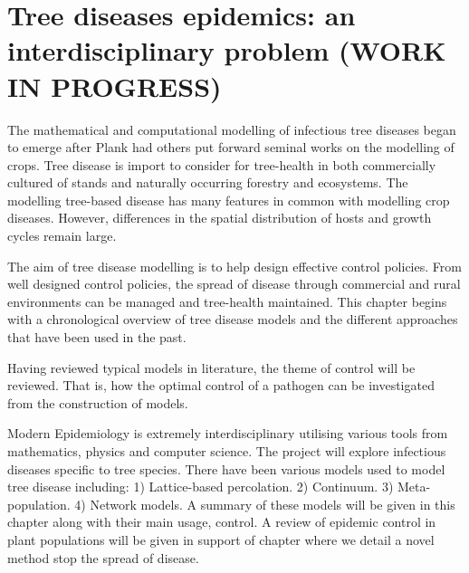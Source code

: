 

\chapter{Tree diseases epidemics: an interdisciplinary problem (WORK IN PROGRESS)}
\label{chapter2:litreview} 

The mathematical and computational modelling of infectious tree diseases began to emerge after Plank had others put forward seminal works on the modelling of crops. Tree disease is import to consider for tree-health in both commercially cultured of stands and naturally occurring forestry and ecosystems. The modelling tree-based disease has many features in common with modelling crop diseases. However, differences in the spatial distribution of hosts and growth cycles remain large.

The aim of tree disease modelling is to help design effective control policies. From well designed control policies, the spread of disease through commercial and rural environments can be managed and tree-health maintained. This chapter begins with a chronological overview of tree disease models and the different approaches that have been used in the past.

Having reviewed typical models in literature, the theme of control will be reviewed. That is, how the optimal control of a pathogen can be investigated from the construction of models.

Modern Epidemiology is extremely interdisciplinary utilising various tools from mathematics, physics and computer science. The project will explore infectious diseases specific to tree species. There have been various models used to model tree disease including: 1) Lattice-based percolation. 2) Continuum. 3) Meta-population. 4) Network models. A summary of these models will be given in this chapter along with their main usage, control. A review of epidemic control in plant populations will be given in support of chapter where we detail a novel method stop the spread of disease. 


